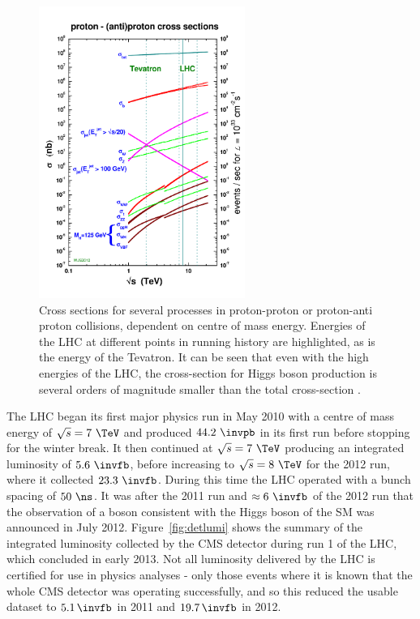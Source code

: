 \begin{figure}[htbp]
   \includegraphics[width=0.6\textwidth]{plots/detector/crosssections2012_v5.pdf}
\caption{Cross sections for several processes in proton-proton or proton-anti
proton collisions, dependent on centre of mass energy. Energies of the LHC at
different points in running history are highlighted, as is the energy of the
Tevatron. It can be seen that even with the high energies of the LHC, the
cross-section for Higgs boson production is several orders of magnitude smaller than
the total cross-section \cite{stirling:xsecs}.}
\label{fig:LHCcrosssections}
\end{figure}

The \ac{LHC} began its first major physics run in May 2010 with a centre of mass
energy of $\sqrt{s} = 7~\TeV$ and produced $44.2~\invpb$ in its first run
before stopping for the winter break. It then continued at $\sqrt{s} = 7~\TeV$
producing an integrated luminosity of $5.6~\invfb$, before increasing to
$\sqrt{s} = 8~\TeV$ for the 2012 run, where it collected $23.3~\invfb$.
During this time the LHC operated with a bunch spacing of $50~\ns$. It
was after the 2011 run and $\approx6~\invfb$ of the 2012 run that the
observation of a boson consistent with the Higgs boson of the \ac{SM} was
announced in July 2012. Figure~\ref{fig:detlumi} shows the summary of the
integrated luminosity collected by the CMS detector during run 1 of the LHC,
which concluded in early 2013. Not all luminosity delivered by the LHC is
certified for use in physics analyses - only those events where it is known that
the whole CMS detector was operating successfully, and so this reduced the
usable dataset to $5.1\,\invfb$ in 2011 and $19.7\,\invfb$ in 2012.

